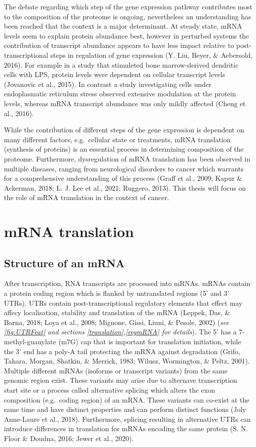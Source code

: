 \documentclass[12pt,openany]{book}
\begin{document}
The debate regarding which step of the gene expression pathway
contributes most to the composition of the proteome is ongoing,
nevertheless an understanding has been reached that the context is a
major determinant. At steady state, mRNA levels seem to explain protein
abundance best, however in perturbed systems the contribution of
transcript abundance appears to have less impact relative to
post-transcriptional steps in regulation of gene expression (Y. Liu,
Beyer, \& Aebersold, 2016). For example in a study that stimuleted bone
marrow-derived dendritic cells with LPS, protein levels were dependent
on cellular transcript levels (Jovanovic et al., 2015). In contrast a
study investigating cells under endoplasmatic reticulum stress observed
extensive modulation at the protein levels, whereas mRNA transcript
abundance was only mildly affected (Cheng et al., 2016).

While the contribution of different steps of the gene expression is
dependent on many different factors, e.g.~cellular state or treatments,
mRNA translation (synthesis of proteins) is an essential process in
determining composition of the proteome. Furthermore, dysregulation of
mRNA translation has been observed in multiple diseases, ranging from
neurological disorders to cancer which warrants for a comprehensive
understanding of this process (Graff et al., 2009; Kapur \& Ackerman,
2018; L. J. Lee et al., 2021; Ruggero, 2013). This thesis will focus on
the role of mRNA translation in the context of cancer. \newline
\section{mRNA translation} \subsection{Structure of an mRNA} After
transcription, RNA transcripts are processed into mRNAs. mRNAs contain a
protein coding region which is flanked by untranslated regions (5' and
3' UTRs). UTRs contain post-transcriptional regulatory elements that
effect may affecy localisation, stability and translation of the mRNA
(Leppek, Das, \& Barna, 2018; Loya et al., 2008; Mignone, Gissi, Liuni,
\& Pesole, 2002) (\emph{see \ref{fig:UTRFeat} and sections
\ref{translation},\ref{regmRNA} for details}). The 5' has a
7-methyl-guanylate (m7G) cap that is important for translation
initiation, while the 3' end has a poly-A tail protecting the mRNA
against degradation (Grifo, Tahara, Morgan, Shatkin, \& Merrick, 1983;
Wilusz, Wormington, \& Peltz, 2001). Multiple different mRNAs (isoforms
or transcript variants) from the same genomic region exist. These
variants may arise due to alternave transcription start site or a
process called alternative splicing which alters the exon composition
(e.g.~coding region) of an mRNA. These variants can co-exist at the same
time and have distinct properties and can perform distinct functions
(Joly Anne-Laure et al., 2018). Furthermore, splicing resulting in
alternative UTRs can introduce differences in translation for mRNAs
encoding the same protein (S. N. Floor \& Doudna, 2016; Jewer et al.,
2020).
\end{document}
